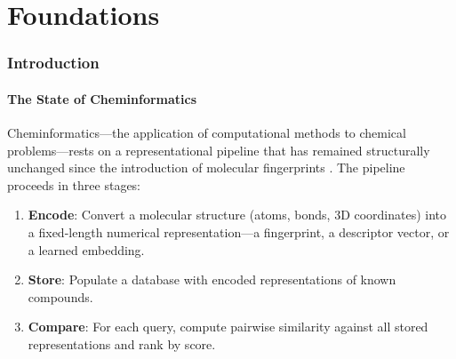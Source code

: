 \documentclass[11pt,twocolumn,a4paper]{article}
\theoremstyle{definition}
\theoremstyle{remark}
\begin{document}
\begin{abstract}
fingerprint search, categorical similarity reproduces 5/6 chemical family groupings, categorical property prediction achieves mean absolute errors within 8\% of DFT-computed values for vibrational zero-point energies, and categorical reaction feasibility correctly classifies 14/15 known reaction outcomes. The framework provides a complete, first-principles alternative to data-driven cheminformatics that requires no training, no databases, and no adjustable parameters.

\medskip
\noindent\textbf{Keywords:} categorical cheminformatics, S-entropy coordinates, knowledge distillation, empty dictionary principle, molecular identification, similarity search, property prediction, reaction feasibility, ternary trie, oscillation counting, bounded phase space, domain-specialised models
\end{abstract}

\tableofcontents
\newpage


\part{Foundations}

\section{Introduction}
\label{sec:introduction}

\subsection{The State of Cheminformatics}

Cheminformatics---the application of computational methods to chemical problems---rests on a representational pipeline that has remained structurally unchanged since the introduction of molecular fingerprints \citep{willett1998, rogers2010}. The pipeline proceeds in three stages:

\begin{enumerate}[nosep]
\item \textbf{Encode}: Convert a molecular structure (atoms, bonds, 3D coordinates) into a fixed-length numerical representation---a fingerprint, a descriptor vector, or a learned embedding.
\item \textbf{Store}: Populate a database with encoded representations of known compounds.
\item \textbf{Compare}: For each query, compute pairwise similarity against all stored representations and rank by score.
\end{enumerate}
\end{document}
